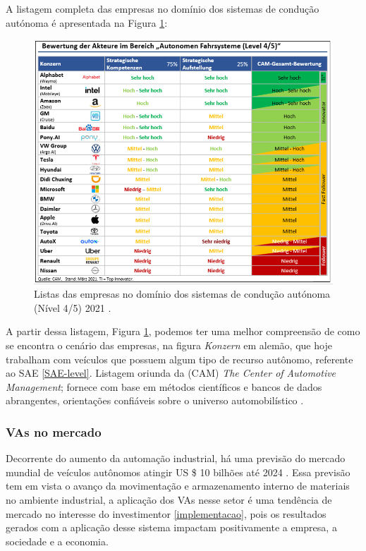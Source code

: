 A listagem completa das empresas no domínio dos sistemas de condução autónoma é apresentada na Figura \ref{figura_companies}:


\begin{figure}[H]
\centering
\includegraphics[width=16cm]{Figures/grafik.png}
\caption{Listas das empresas no domínio dos sistemas de condução autónoma (Nível 4/5) 2021 \cite{CAM}.}
\label{figura_companies}
\end{figure}

A partir dessa listagem, Figura \ref{figura_companies}, podemos ter uma melhor compreensão de como se encontra o cenário das empresas, na figura \textit{Konzern} em alemão, que hoje trabalham com veículos que possuem algum tipo de recurso autônomo, referente ao SAE \ref{SAE-level}. Listagem oriunda da (CAM) \textit{The Center of Automotive Management}; fornece com base em métodos científicos e bancos de dados abrangentes, orientações confiáveis sobre o universo automobilístico \cite{CAM}.

\subsubsection{VAs no mercado}

Decorrente  do aumento da automação industrial, há uma previsão do mercado mundial de veículos autônomos atingir US \$ 10 bilhões até 2024 \cite{mercadoo}. Essa previsão tem em vista o avanço da movimentação e armazenamento interno de materiais no ambiente industrial, a aplicação dos VAs nesse setor é uma tendência de mercado no interesse do investimentor \ref{implementacao}, pois os resultados gerados com a aplicação desse sistema impactam positivamente a empresa, a sociedade e a economia.

